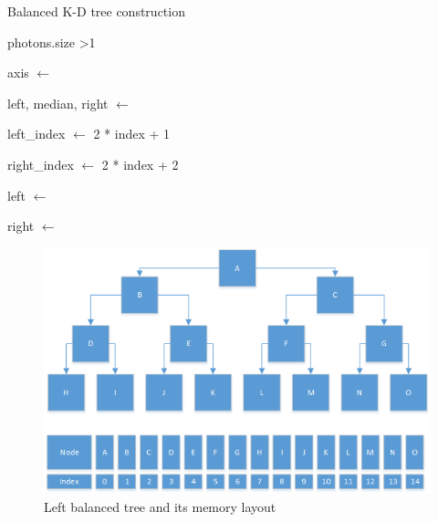\begin{algorithm}
\begin{algorithmic}
\caption{Balanced K-D tree construction}
\If
{
photons.size \textgreater 1
}
{

	axis $\gets$ 

	left, median, right $\gets$ 

	left\_index  $\gets$ 2 * index + 1

	right\_index $\gets$ 2 * index + 2

	{

		left $\gets$ 
	}
	\EndIf

	{

		right $\gets$ 
	}
	\EndIf

}
\Else
{

}
\EndIf
\EndFunction
%
%
%
%
%
%
%
%

\end{algorithmic}
\end{algorithm}


\begin{figure}
\centering
\includegraphics[scale=0.75]{./images/left-balanced-tree.png}
\caption{Left balanced tree and its memory layout}
\end{figure}

